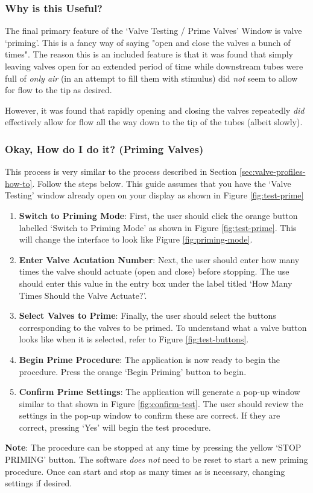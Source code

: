 \documentclass{article}
\begin{document}
\subsubsection{Why is this Useful?}
The final primary feature of the `Valve Testing / Prime Valves' Window is valve `priming'. This is a fancy way of saying "open and close the
valves a bunch of times". The reason this is an included feature is that it was found that simply leaving valves open for an extended period
of time while downstream tubes were full of \textit{only air} (in an attempt to fill them with stimulus) did \textit{not} seem to allow for 
flow to the tip as desired. 

However, it was found that rapidly opening and closing the valves repeatedly \textit{did} effectively allow for flow all the way down to the 
tip of the tubes (albeit slowly).

\subsubsection{Okay, How do I do it? (Priming Valves)}
This process is very similar to the process described in Section \ref{sec:valve-profiles-how-to}. Follow the steps below. This guide assumes
that you have the `Valve Testing' window already open on your display as shown in Figure \ref{fig:test-prime}

\begin{enumerate}
    \item \textbf{Switch to Priming Mode}: First, the user should click the orange button labelled `Switch to Priming Mode' as shown in 
        Figure \ref{fig:test-prime}. This will change the interface to look like Figure \ref{fig:priming-mode}.
            \item \textbf{Enter Valve Acutation Number}: Next, the user should enter how many times the valve should actuate (open and close) before 
        stopping. The use should enter this value in the entry box under the label titled `How Many Times Should the Valve Actuate?'. 
    \item \textbf{Select Valves to Prime}: Finally, the user should select the buttons corresponding to the valves to be primed. 
        To understand what a valve button looks like when it is selected, refer to Figure \ref{fig:test-buttons}.
    \item \textbf{Begin Prime Procedure}: The application is now ready to begin the procedure. Press the orange `Begin Priming' button to 
        begin. 
    \item \textbf{Confirm Prime Settings}: The application will generate a pop-up window similar to that shown in Figure \ref{fig:confirm-test}.
        The user should review the settings in the pop-up window to confirm these are correct. If they are correct, pressing `Yes' will 
        begin the test procedure.
\end{enumerate}
\textbf{Note}: The procedure can be stopped at any time by pressing the yellow `STOP PRIMING' button. The software \textit{does not} need to 
be reset to start a new priming procedure. Once can start and stop as many times as is necessary, changing settings if desired.
\end{document}
